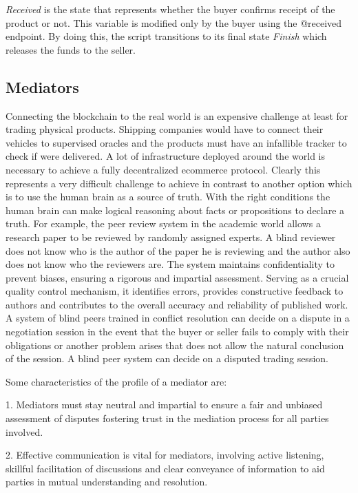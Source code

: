 \documentclass[12pt]{article}
\begin{document}
\emph{Received} is the state that represents whether the buyer confirms receipt of the product or not. This variable is modified only by the buyer using the @received endpoint.
By doing this, the script transitions to its final state \emph{Finish} which releases the funds to the seller.
 
\subsection { Mediators }  

Connecting the blockchain to the real world is an expensive challenge at least for trading physical products.
Shipping companies would have to connect their vehicles to supervised oracles and the products must have an infallible tracker to check if were delivered.
A lot of infrastructure deployed around the world is necessary to achieve a fully decentralized ecommerce protocol.
Clearly this represents a very difficult challenge to achieve in contrast to another option which is to use the human brain as a source of truth.
With the right conditions the human brain can make logical reasoning about facts or propositions to declare a truth.
For example, the peer review system in the academic world allows a research paper to be reviewed by randomly assigned experts.
A blind reviewer does not know who is the author of the paper he is reviewing and the author also does not know who the reviewers are.
The system maintains confidentiality to prevent biases, ensuring a rigorous and impartial assessment. Serving as a crucial quality control mechanism, it identifies errors, provides constructive feedback to authors and contributes to the overall accuracy and reliability of published work. 
A system of blind peers trained in conflict resolution can decide on a dispute in a negotiation session in the event that the buyer or seller fails to comply with their obligations or another problem arises that does not allow the natural conclusion of the session.
A blind peer system can decide on a disputed trading session.

Some characteristics of the profile of a mediator are:

1. Mediators must stay neutral and impartial to ensure a fair and unbiased assessment of disputes fostering trust in the mediation process for all parties involved.

2. Effective communication is vital for mediators, involving active listening, skillful facilitation of discussions and clear conveyance of information to aid parties in mutual understanding and resolution.
\end{document}
